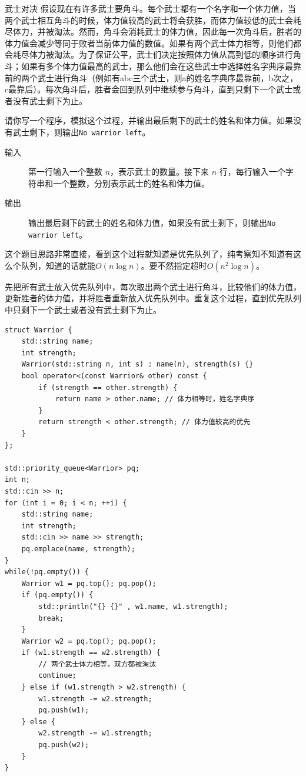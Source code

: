 \begin{example}{武士对决}{}
    假设现在有许多武士要角斗。每个武士都有一个名字和一个体力值，当两个武士相互角斗的时候，体力值较高的武士将会获胜，而体力值较低的武士会耗尽体力，并被淘汰。然而，角斗会消耗武士的体力值，因此每一次角斗后，胜者的体力值会减少等同于败者当前体力值的数值。如果有两个武士体力相等，则他们都会耗尽体力被淘汰。为了保证公平，武士们决定按照体力值从高到低的顺序进行角斗；如果有多个体力值最高的武士，那么他们会在这些武士中选择姓名字典序最靠前的两个武士进行角斗（例如有abc三个武士，则a的姓名字典序最靠前，b次之，c最靠后）。每次角斗后，胜者会回到队列中继续参与角斗，直到只剩下一个武士或者没有武士剩下为止。

    请你写一个程序，模拟这个过程，并输出最后剩下的武士的姓名和体力值。如果没有武士剩下，则输出\verb|No warrior left|。
    
    \begin{description}
        \item[输入] 第一行输入一个整数 $n$，表示武士的数量。接下来 $n$ 行，每行输入一个字符串和一个整数，分别表示武士的姓名和体力值。
        \item[输出] 输出最后剩下的武士的姓名和体力值，如果没有武士剩下，则输出\verb|No warrior left|。
    \end{description}
    \tcblower
    这个题目思路非常直接，看到这个过程就知道是优先队列了，纯考察知不知道有这么个队列，知道的话就能$O(n\log n)$。要不然指定超时$O(n^2\log n)$。

    先把所有武士放入优先队列中，每次取出两个武士进行角斗，比较他们的体力值，更新胜者的体力值，并将胜者重新放入优先队列中。重复这个过程，直到优先队列中只剩下一个武士或者没有武士剩下为止。

    \begin{verbatim}
struct Warrior {
    std::string name;
    int strength;
    Warrior(std::string n, int s) : name(n), strength(s) {}
    bool operator<(const Warrior& other) const {
        if (strength == other.strength) {
            return name > other.name; // 体力相等时，姓名字典序
        }
        return strength < other.strength; // 体力值较高的优先
    }
};

std::priority_queue<Warrior> pq;
int n;
std::cin >> n;
for (int i = 0; i < n; ++i) {
    std::string name;
    int strength;
    std::cin >> name >> strength;
    pq.emplace(name, strength);
}
while(!pq.empty()) {
    Warrior w1 = pq.top(); pq.pop();
    if (pq.empty()) {
        std::println("{} {}" , w1.name, w1.strength);
        break;
    }
    Warrior w2 = pq.top(); pq.pop();
    if (w1.strength == w2.strength) {
        // 两个武士体力相等，双方都被淘汰
        continue;
    } else if (w1.strength > w2.strength) {
        w1.strength -= w2.strength;
        pq.push(w1);
    } else {
        w2.strength -= w1.strength;
        pq.push(w2);
    }
}
    \end{verbatim}
\end{example}

